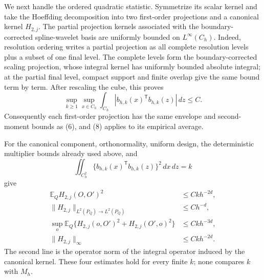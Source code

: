 We next handle the ordered quadratic statistic.  Symmetrize its scalar kernel and take the Hoeffding decomposition into two first-order projections and a canonical kernel \(H_{2,j}\).  The partial projection kernels associated with the boundary-corrected spline-wavelet basis are uniformly bounded on \(L^\infty(C_h)\).  Indeed, resolution ordering writes a partial projection as all complete resolution levels plus a subset of one final level.  The complete levels form the boundary-corrected scaling projection, whose integral kernel has uniformly bounded absolute integral; at the partial final level, compact support and finite overlap give the same bound term by term.  After rescaling the cube, this proves
\[
 \sup_{k\ge1}\sup_{x\in C_h}
 \int_{C_h}\left|b_{h,k}(x)^{\mathsf T}b_{h,k}(z)\right|\,dz
 \le C.                                                        \tag{9}
\]
Consequently each first-order projection has the same envelope and second-moment bounds as (6), and (8) applies to its empirical average.

For the canonical component, orthonormality, uniform design, the deterministic multiplier bounds already used above, and
\[
 \iint_{C_h^2}\{b_{h,k}(x)^{\mathsf T}b_{h,k}(z)\}^2\,dx\,dz=k
\]
give
\[
 \begin{aligned}
 \mathbb E_Q H_{2,j}(O,O')^2&\le Ckh^{-2d},\\
 \lVert H_{2,j}\rVert_{L^2(P_Q)\to L^2(P_Q)}&\le Ch^{-d},\\
 \sup_o\mathbb E_Q\{H_{2,j}(o,O')^2+H_{2,j}(O',o)^2\}&\le Ckh^{-3d},\\
 \lVert H_{2,j}\rVert_\infty&\le Ckh^{-2d}.
 \end{aligned}                                                \tag{10}
\]
The second line is the operator norm of the integral operator induced by the canonical kernel.  These four estimates hold for every finite \(k\); none compares \(k\) with \(M_h\).

